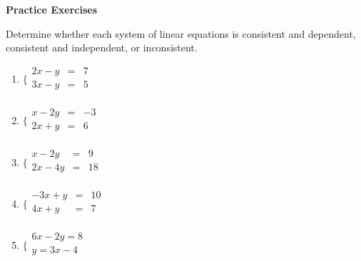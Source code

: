 \textbf{Practice Exercises}

\vspce

Determine whether each system of linear equations is consistent and dependent, consistent and independent, or inconsistent. 
\begin{enumerate}[label = \arabic*. ]
\item \hspce $\bigg\{
\begin{array}{lcl}
2x-y & = & 7 \\
3x-y & = & 5 \\
\end{array}$

\vspce 
\item \hspce $\bigg\{
\begin{array}{lcl}
x-2y & = & -3 \\
2x+y & = & 6 \\
\end{array}$
\vspce 
\item \hspce $\bigg\{
\begin{array}{lcl}
x - 2y & = & 9 \\
2x - 4y & = & 18 \\
\end{array}$
\vspce 
\item \hspce $\bigg\{
\begin{array}{lcl}
-3x + y & = & 10 \\
4x  +  y & = & 7 \\
\end{array}$
\vspce 
\item \hspce $\bigg\{
\begin{array}{l}
6x - 2y=8  \\
y = 3x-4 \\
\end{array}$
\end{enumerate}  



